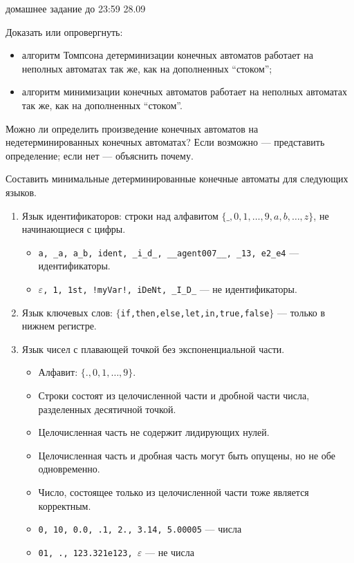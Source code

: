 \documentclass[12pt]{article}
\begin{document}

{\Large домашнее задание до 23:59 28.09}
\bigskip

\enumerate
{
  \item
  {
    Доказать или опровергнуть: 
    \begin{itemize}
      \item алгоритм Томпсона детерминизации конечных автоматов работает на неполных автоматах так же, как на дополненных ``стоком'';
      \item алгоритм минимизации конечных автоматов работает на неполных автоматах так же, как на дополненных ``стоком''.
    \end{itemize}
  }
  \item 
  {
    Можно ли определить произведение конечных автоматов на недетерминированных конечных автоматах? Если возможно --- представить определение; если нет --- объяснить почему.
  }
  \item
  {
    Составить минимальные детерминированные конечные автоматы для следующих языков. 
    \begin{enumerate}
        \item Язык идентификаторов: строки над алфавитом $\{\_,0,1,\dots,9,a,b,\dots,z\}$, не начинающиеся с цифры.
        \begin{itemize}
            \item \verb;a, _a, a_b, ident, _i_d_, __agent007__, _13, e2_e4; --- идентификаторы.
            \item $\varepsilon$\verb;, 1, 1st, !myVar!, iDeNt, _I_D_; --- не идентификаторы.
        \end{itemize}
        \item Язык ключевых слов: $\{$\verb;if,then,else,let,in,true,false;$\}$ --- только в нижнем регистре.
        \item Язык чисел с плавающей точкой без экспоненциальной части.
        \begin{itemize}
            \item Алфавит: $\{., 0,1,\dots,9\}$.
            \item Строки состоят из целочисленной части и дробной части числа, разделенных десятичной точкой. 
            \item Целочисленная часть не содержит лидирующих нулей.
            \item Целочисленная часть и дробная часть могут быть опущены, но не обе одновременно. 
            \item Число, состоящее только из целочисленной части тоже является корректным. 
            \item \verb;0, 10, 0.0, .1, 2., 3.14, 5.00005; --- числа
            \item \verb;01, ., 123.321e123, ;$\varepsilon$ --- не числа
        \end{itemize}
    \end{enumerate}
  }
}
\end{document}
